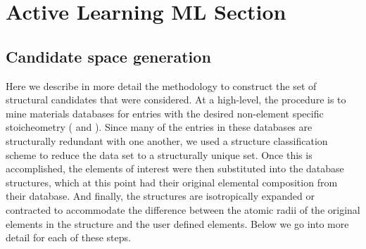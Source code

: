 

\section{Active Learning ML Section}  %
%

\subsection{Candidate space generation}  %
%


%
Here we describe in more detail the methodology to construct the set of structural candidates that were considered.
%
At a high-level, the procedure is to mine materials databases for entries with the desired non-element specific stoicheometry ( \ABtwo and \ABthree).
%
Since many of the entries in these databases are structurally redundant with one another,
we used a structure classification scheme to reduce the data set to a structurally unique set.
%
Once this is accomplished, the elements of interest were then substituted into the database structures, which at this point had their original elemental composition from their database.
%
And finally, the structures are isotropically expanded or contracted to accommodate the difference between the atomic radii of the original elements in the structure and the user defined elements.
%
Below we go into more detail for each of these steps.


